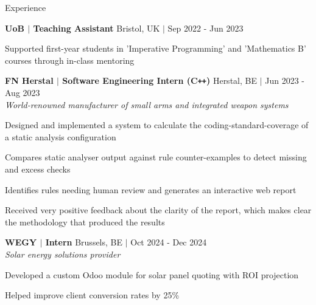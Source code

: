\documentclass{resume} %
\let\olditemize\itemize
\let\endolditemize\enditemize
\renewenvironment{itemize}{
  \vspace*{-6pt} %
  \olditemize
  \setlength{\itemsep}{0pt}
  \setlength{\topsep}{0pt}         %
  \setlength{\partopsep}{0pt}      %
  \setlength{\parsep}{0pt}         %
  \setlength{\parskip}{0pt}        %
  \setlength{\leftmargin}{1em}
}{
  \endolditemize
  \vspace*{-6pt} %
}
\begin{document}
\begin{rSection}{Experience}

\textbf{UoB $\boldsymbol{\vert}$ Teaching Assistant} \hfill Bristol, UK $\boldsymbol{\vert}$ Sep 2022 - Jun 2023
\begin{itemize}
    \item Supported first-year students in 'Imperative Programming' and 'Mathematics B' courses through in-class mentoring
\end{itemize}

\textbf{FN Herstal $\boldsymbol{\vert}$ Software Engineering Intern (C\texttt{++})} \hfill Herstal, BE $\boldsymbol{\vert}$ Jun 2023 - Aug 2023\\
\textit{World-renowned manufacturer of small arms and integrated weapon systems}
\begin{itemize}
    \item Designed and implemented a system to calculate the coding-standard-coverage of a static analysis configuration
    \item Compares static analyser output against rule counter-examples to detect missing and excess checks
    \item Identifies rules needing human review and generates an interactive web report
    \item Received very positive feedback about the clarity of the report, which makes clear the methodology that produced the results
\end{itemize}

\textbf{WEGY $\boldsymbol{\vert}$ Intern} \hfill Brussels, BE $\boldsymbol{\vert}$ Oct 2024 - Dec 2024\\
\textit{Solar energy solutions provider}
\begin{itemize}
    \item Developed a custom Odoo module for solar panel quoting with ROI projection
    \item Helped improve client conversion rates by 25\%
\end{itemize}

\end{rSection}

\end{document}
